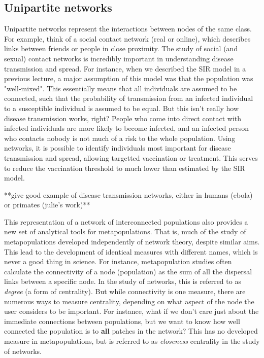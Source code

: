 \documentclass[12pt]{article}
\begin{document}
\subsection*{Unipartite networks}
Unipartite networks represent the interactions between nodes of the same class. For example, think of a social contact network (real or online), which describes links between friends or people in close proximity. The study of social (and sexual) contact networks is incredibly important in understanding disease transmission and spread. For instance, when we described the SIR model in a previous lecture, a major assumption of this model was that the population was "well-mixed". This essentially means that all individuals are assumed to be connected, such that the probability of transmission from an infected individual to a susceptible individual is assumed to be equal. But this isn't really how disease transmission works, right? People who come into direct contact with infected individuals are more likely to become infected, and an infected person who contacts nobody is not much of a risk to the whole population. Using networks, it is possible to identify individuals most important for disease transmission and spread, allowing targetted vaccination or treatment. This serves to reduce the vaccination threshold to much lower than estimated by the SIR model. 

**give good example of disease transmission networks, either in humans (ebola) or primates (julie's work)**

This representation of a network of interconnected populations also provides a new set of analytical tools for metapopulations. That is, much of the study of metapopulations developed independently of network theory, despite similar aims. This lead to the development of identical measures with different names, which is never a good thing in science. For instance, metapopulation studies often calculate the connectivity of a node (population) as the sum of all the dispersal links between a specific node. In the study of networks, this is referred to as \textit{degree} (a form of centrality). But while connectivity is one measure, there are numerous ways to measure centrality, depending on what aspect of the node the user considers to be important. For instance, what if we don't care just about the immediate connections between populations, but we want to know how well connected the population is to \textbf{all} patches in the network? This has no developed measure in metapopulations, but is referred to as \textit{closeness} centrality in the study of networks. 
\end{document}
